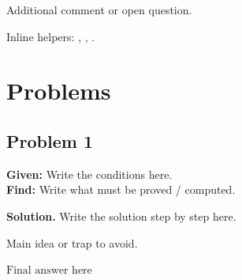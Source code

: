 \documentclass[a4paper, 12pt]{article}
\begin{document}
\begin{dashframe}
  Additional comment or open question.
\end{dashframe}

Inline helpers: , , .


\section{Problems}

\subsection{Problem 1}

\begin{dashframe}
  \textbf{Given:} Write the conditions here. \\
  \textbf{Find:} Write what must be proved / computed.
\end{dashframe}

\textbf{Solution.} Write the solution step by step here.

\begin{nota bene}
  Main idea or trap to avoid.
\end{nota bene}

\begin{example}[Answer]
  $\boxed{\text{Final answer here}}$
\end{example}

\end{document}

